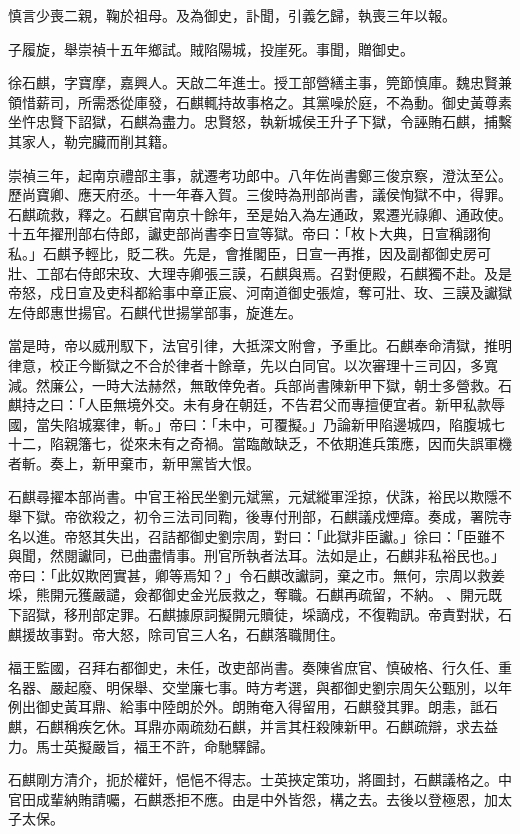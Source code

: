 \begin{pinyinscope}
慎言少喪二親，鞠於祖母。及為御史，訃聞，引義乞歸，執喪三年以報。

子履旋，舉崇禎十五年鄉試。賊陷陽城，投崖死。事聞，贈御史。

徐石麒，字寶摩，嘉興人。天啟二年進士。授工部營繕主事，筦節慎庫。魏忠賢兼領惜薪司，所需悉從庫發，石麒輒持故事格之。其黨噪於庭，不為動。御史黃尊素坐忤忠賢下詔獄，石麒為盡力。忠賢怒，執新城侯王升子下獄，令誣賄石麒，捕繫其家人，勒完臟而削其籍。

崇禎三年，起南京禮部主事，就遷考功郎中。八年佐尚書鄭三俊京察，澄汰至公。歷尚寶卿、應天府丞。十一年春入賀。三俊時為刑部尚書，議侯恂獄不中，得罪。石麒疏救，釋之。石麒官南京十餘年，至是始入為左通政，累遷光祿卿、通政使。十五年擢刑部右侍郎，讞吏部尚書李日宣等獄。帝曰：「枚卜大典，日宣稱詡徇私。」石麒予輕比，貶二秩。先是，會推閣臣，日宣一再推，因及副都御史房可壯、工部右侍郎宋玫、大理寺卿張三謨，石麒與焉。召對便殿，石麒獨不赴。及是帝怒，戍日宣及吏科都給事中章正宸、河南道御史張煊，奪可壯、玫、三謨及讞獄左侍郎惠世揚官。石麒代世揚掌部事，旋進左。

當是時，帝以威刑馭下，法官引律，大抵深文附會，予重比。石麒奉命清獄，推明律意，校正今斷獄之不合於律者十餘章，先以白同官。以次審理十三司囚，多寬減。然廉公，一時大法赫然，無敢倖免者。兵部尚書陳新甲下獄，朝士多營救。石麒持之曰：「人臣無境外交。未有身在朝廷，不告君父而專擅便宜者。新甲私款辱國，當失陷城寨律，斬。」帝曰：「未中，可覆擬。」乃論新甲陷邊城四，陷腹城七十二，陷親籓七，從來未有之奇禍。當臨敵缺乏，不依期進兵策應，因而失誤軍機者斬。奏上，新甲棄市，新甲黨皆大恨。

石麒尋擢本部尚書。中官王裕民坐劉元斌黨，元斌縱軍淫掠，伏誅，裕民以欺隱不舉下獄。帝欲殺之，初令三法司同鞫，後專付刑部，石麒議戍煙瘴。奏成，署院寺名以進。帝怒其失出，召詰都御史劉宗周，對曰：「此獄非臣讞。」徐曰：「臣雖不與聞，然閱讞同，已曲盡情事。刑官所執者法耳。法如是止，石麒非私裕民也。」帝曰：「此奴欺罔實甚，卿等焉知？」令石麒改讞詞，棄之市。無何，宗周以救姜埰，熊開元獲嚴譴，僉都御史金光辰救之，奪職。石麒再疏留，不納。、開元既下詔獄，移刑部定罪。石麒據原詞擬開元贖徒，埰謫戍，不復鞫訊。帝責對狀，石麒援故事對。帝大怒，除司官三人名，石麒落職閒住。

福王監國，召拜右都御史，未任，改吏部尚書。奏陳省庶官、慎破格、行久任、重名器、嚴起廢、明保舉、交堂廉七事。時方考選，與都御史劉宗周矢公甄別，以年例出御史黃耳鼎、給事中陸朗於外。朗賄奄入得留用，石麒發其罪。朗恚，詆石麒，石麒稱疾乞休。耳鼎亦兩疏劾石麒，并言其枉殺陳新甲。石麒疏辯，求去益力。馬士英擬嚴旨，福王不許，命馳驛歸。

石麒剛方清介，扼於權奸，悒悒不得志。士英挾定策功，將圖封，石麒議格之。中官田成輩納賄請囑，石麒悉拒不應。由是中外皆怨，構之去。去後以登極恩，加太子太保。


\end{pinyinscope}

